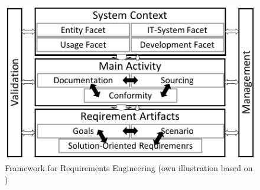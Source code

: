 \begin{figure}[H]
    \centering
    \includegraphics[scale=1.5]{img/ReqAnFrameWork.pdf}
    \caption[Framework for Requirements Engineering]{Framework for Requirements Engineering (own illustration based on \cite[41]{Pohl.2007})}
    \label{fig:reqFramework}
\end{figure}

